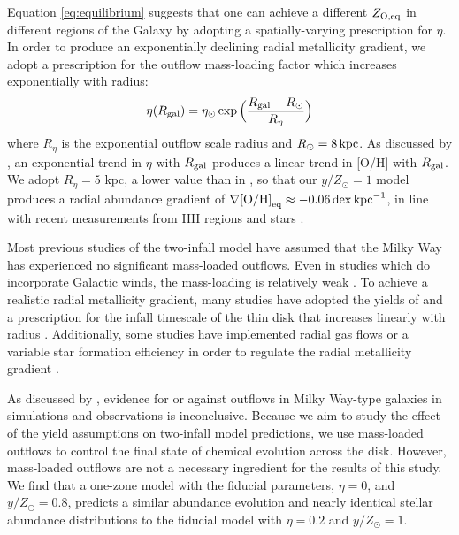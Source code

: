 \documentclass[twocolumn,twocolappendix,linenumbers]{aastex631}
\newcommand{\mathOH}{{\rm [O/H]}}
\newcommand{\yZ}[1]{$y/Z_\odot=#1$}
\newcommand{\kpc}{\,{\rm kpc}}
\begin{document}
Equation \ref{eq:equilibrium} suggests that one can achieve a different $Z_{\rm O,eq}$ in different regions of the Galaxy by adopting a spatially-varying prescription for $\eta$. In order to produce an exponentially declining radial metallicity gradient, we adopt a prescription for the outflow mass-loading factor which increases exponentially with radius:
\begin{equation}
    \eta(R_{\rm gal}) = \eta_\odot \exp\Big(\frac{R_{\rm gal}-R_\odot}{R_\eta}\Big)
\end{equation}
where $R_\eta$ is the exponential outflow scale radius and $R_\odot=8\kpc$. As discussed by \citet{johnson_milky_2024}, an exponential trend in $\eta$ with $R_{\rm gal}$ produces a linear trend in [O/H] with $R_{\rm gal}$. We adopt $R_\eta=5$ kpc, a lower value than in \citet{johnson_milky_2024}, so that our $y/Z_\odot=1$ model produces a radial abundance gradient of $\nabla\mathOH_{\rm eq}\approx-0.06\,{\rm dex}\kpc^{-1}$, in line with recent measurements from HII regions \citep{mendez-delgado_gradients_2022} and stars \citep{myers_open_2022,johnson_milky_2024}.

Most previous studies of the two-infall model have assumed that the Milky Way has experienced no significant mass-loaded outflows. Even in studies which do incorporate Galactic winds, the mass-loading is relatively weak \citep[e.g., $\eta\approx0.2$ in][]{palicio_analytic_2023}. To achieve a realistic radial metallicity gradient, many studies have adopted the yields of \citet{francois_evolution_2004} and a prescription for the infall timescale of the thin disk that increases linearly with radius \citep[e.g.,][]{chiappini_chemical_1997,romano_mass_2000}. Additionally, some studies have implemented radial gas flows or a variable star formation efficiency in order to regulate the radial metallicity gradient \citep[e.g.,][]{spitoni_effects_2011,palla_chemical_2020}.

As discussed by \citet{johnson_milky_2024}, evidence for or against outflows in Milky Way-type galaxies in simulations and observations is inconclusive. Because we aim to study the effect of the yield assumptions on two-infall model predictions, we use mass-loaded outflows to control the final state of chemical evolution across the disk. However, mass-loaded outflows are not a necessary ingredient for the results of this study. We find that a one-zone model with the fiducial parameters, $\eta=0$, and \yZ{0.8}, predicts a similar abundance evolution and nearly identical stellar abundance distributions to the fiducial model with $\eta=0.2$ and \yZ{1}. %
\end{document}
